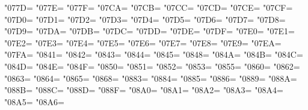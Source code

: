 \XeTeXcharclass"077D=\KclassArabD
\XeTeXcharclass"077E=\KclassArabD
\XeTeXcharclass"077F=\KclassArabD
\XeTeXcharclass"07CA=\KclassArabD
\XeTeXcharclass"07CB=\KclassArabD
\XeTeXcharclass"07CC=\KclassArabD
\XeTeXcharclass"07CD=\KclassArabD
\XeTeXcharclass"07CE=\KclassArabD
\XeTeXcharclass"07CF=\KclassArabD
\XeTeXcharclass"07D0=\KclassArabD
\XeTeXcharclass"07D1=\KclassArabD
\XeTeXcharclass"07D2=\KclassArabD
\XeTeXcharclass"07D3=\KclassArabD
\XeTeXcharclass"07D4=\KclassArabD
\XeTeXcharclass"07D5=\KclassArabD
\XeTeXcharclass"07D6=\KclassArabD
\XeTeXcharclass"07D7=\KclassArabD
\XeTeXcharclass"07D8=\KclassArabD
\XeTeXcharclass"07D9=\KclassArabD
\XeTeXcharclass"07DA=\KclassArabD
\XeTeXcharclass"07DB=\KclassArabD
\XeTeXcharclass"07DC=\KclassArabD
\XeTeXcharclass"07DD=\KclassArabD
\XeTeXcharclass"07DE=\KclassArabD
\XeTeXcharclass"07DF=\KclassArabD
\XeTeXcharclass"07E0=\KclassArabD
\XeTeXcharclass"07E1=\KclassArabD
\XeTeXcharclass"07E2=\KclassArabD
\XeTeXcharclass"07E3=\KclassArabD
\XeTeXcharclass"07E4=\KclassArabD
\XeTeXcharclass"07E5=\KclassArabD
\XeTeXcharclass"07E6=\KclassArabD
\XeTeXcharclass"07E7=\KclassArabD
\XeTeXcharclass"07E8=\KclassArabD
\XeTeXcharclass"07E9=\KclassArabD
\XeTeXcharclass"07EA=\KclassArabD
\XeTeXcharclass"07FA=\KclassArabD
\XeTeXcharclass"0841=\KclassArabD
\XeTeXcharclass"0842=\KclassArabD
\XeTeXcharclass"0843=\KclassArabD
\XeTeXcharclass"0844=\KclassArabD
\XeTeXcharclass"0845=\KclassArabD
\XeTeXcharclass"0848=\KclassArabD
\XeTeXcharclass"084A=\KclassArabD
\XeTeXcharclass"084B=\KclassArabD
\XeTeXcharclass"084C=\KclassArabD
\XeTeXcharclass"084D=\KclassArabD
\XeTeXcharclass"084E=\KclassArabD
\XeTeXcharclass"084F=\KclassArabD
\XeTeXcharclass"0850=\KclassArabD
\XeTeXcharclass"0851=\KclassArabD
\XeTeXcharclass"0852=\KclassArabD
\XeTeXcharclass"0853=\KclassArabD
\XeTeXcharclass"0855=\KclassArabD
\XeTeXcharclass"0860=\KclassArabD
\XeTeXcharclass"0862=\KclassArabD
\XeTeXcharclass"0863=\KclassArabD
\XeTeXcharclass"0864=\KclassArabD
\XeTeXcharclass"0865=\KclassArabD
\XeTeXcharclass"0868=\KclassArabD
\XeTeXcharclass"0883=\KclassArabD
\XeTeXcharclass"0884=\KclassArabD
\XeTeXcharclass"0885=\KclassArabD
\XeTeXcharclass"0886=\KclassArabD
\XeTeXcharclass"0889=\KclassArabD
\XeTeXcharclass"088A=\KclassArabD
\XeTeXcharclass"088B=\KclassArabD
\XeTeXcharclass"088C=\KclassArabD
\XeTeXcharclass"088D=\KclassArabD
\XeTeXcharclass"088F=\KclassArabD
\XeTeXcharclass"08A0=\KclassArabD
\XeTeXcharclass"08A1=\KclassArabD
\XeTeXcharclass"08A2=\KclassArabD
\XeTeXcharclass"08A3=\KclassArabD
\XeTeXcharclass"08A4=\KclassArabD
\XeTeXcharclass"08A5=\KclassArabD
\XeTeXcharclass"08A6=\KclassArabD
